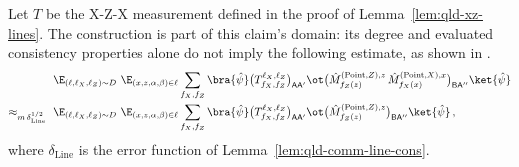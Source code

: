 \begin{lemma}
	\label{lem:claim-17-2}
	\notready
	Let $T$ be the X-Z-X measurement defined in the proof of
	Lemma~\ref{lem:qld-xz-lines}. The construction is part of this claim's
	domain: its degree and evaluated consistency properties alone do not
	imply the following estimate, as shown in
	\cite{gap:qpbt_subline-claims-line-marginal}.
	\begin{align*}
		\E_{(\ell,\ell_X,\ell_Z) \sim D}\
		\E_{(x,z,\alpha,\beta) \in \ell}
		&\sum_{f_X,f_Z} \bra{\hat\psi}
		\big(T^{\ell_X,\ell_Z}_{f_X,f_Z}\big)_{\mathsf{A}\mathsf{A}'} \ot
		\big(\hat{M}^{(\mathrm{Point},Z),z}_{f_Z(z)} \,
		\hat{M}^{(\mathrm{Point},X),x}_{f_X(x)}
		\big)_{\mathsf{B}\mathsf{A}''}
		\ket{\hat\psi} \\
		\approx_{m\,\delta_{\mathrm{Line}}^{1/2}}\
		\E_{(\ell,\ell_X,\ell_Z) \sim D}\
		\E_{(x,z,\alpha,\beta) \in \ell}
		&\sum_{f_X,f_Z} \bra{\hat\psi}
		\big(T^{\ell_X,\ell_Z}_{f_X,f_Z}\big)_{\mathsf{A}\mathsf{A}'} \ot
		\big(\hat{M}^{(\mathrm{Point},Z),z}_{f_Z(z)}
		\big)_{\mathsf{B}\mathsf{A}''}
		\ket{\hat\psi}\,,
	\end{align*}
	where $\delta_{\mathrm{Line}}$ is the error function of
	Lemma~\ref{lem:qld-comm-line-cons}.
\end{lemma}
